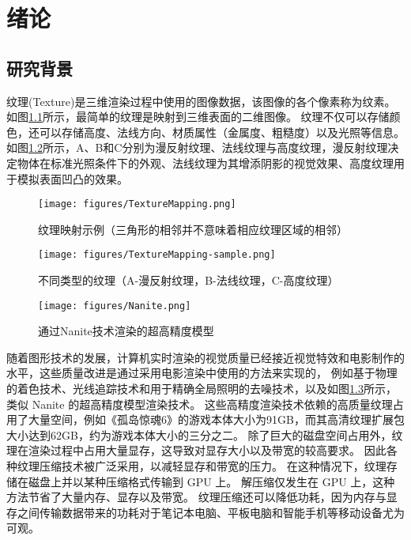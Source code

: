 
\chapter{绪论}

\section{研究背景}
纹理(Texture)是三维渲染过程中使用的图像数据，该图像的各个像素称为纹素。如图\ref{fig:TextureMapping}所示，最简单的纹理是映射到三维表面的二维图像。
纹理不仅可以存储颜色，还可以存储高度、法线方向、材质属性（金属度、粗糙度）以及光照等信息。
如图\ref{fig:TextureMapping-sample}所示，A、B和C分别为漫反射纹理、法线纹理与高度纹理，漫反射纹理决定物体在标准光照条件下的外观、法线纹理为其增添阴影的视觉效果、高度纹理用于模拟表面凹凸的效果。

\begin{figure}[htbp]
    \centering
    \texttt{[image: figures/TextureMapping.png]}
    \caption{纹理映射示例（三角形的相邻并不意味着相应纹理区域的相邻）\cite{paltashev2014texture}}
    \label{fig:TextureMapping}
\end{figure}

\begin{figure}[htbp]
    \centering
    \texttt{[image: figures/TextureMapping-sample.png]}
    \caption{不同类型的纹理（A-漫反射纹理，B-法线纹理，C-高度纹理）\cite{paltashev2014texture}}
    \label{fig:TextureMapping-sample}
\end{figure}

\begin{figure}[htbp]
    \centering
    \texttt{[image: figures/Nanite.png]}
    \caption{通过Nanite技术渲染的超高精度模型\cite{Nanite}}
    \label{fig:Nanite}
\end{figure}

随着图形技术的发展，计算机实时渲染的视觉质量已经接近视觉特效和电影制作的水平，这些质量改进是通过采用电影渲染中使用的方法来实现的，
例如基于物理的着色技术、光线追踪技术和用于精确全局照明的去噪技术，以及如图\ref{fig:Nanite}所示，类似 Nanite 的超高精度模型渲染技术。
这些高精度渲染技术依赖的高质量纹理占用了大量空间，例如《孤岛惊魂6》的游戏本体大小为91GB，而其高清纹理扩展包大小达到62GB，约为游戏本体大小的三分之二\cite{FarCry6}。
除了巨大的磁盘空间占用外，纹理在渲染过程中占用大量显存，这导致对显存大小以及带宽的较高要求。
因此各种纹理压缩技术被广泛采用，以减轻显存和带宽的压力。
在这种情况下，纹理存储在磁盘上并以某种压缩格式传输到 GPU 上。
解压缩仅发生在 GPU 上，这种方法节省了大量内存、显存以及带宽。
纹理压缩还可以降低功耗，因为内存与显存之间传输数据带来的功耗对于笔记本电脑、平板电脑和智能手机等移动设备尤为可观。

